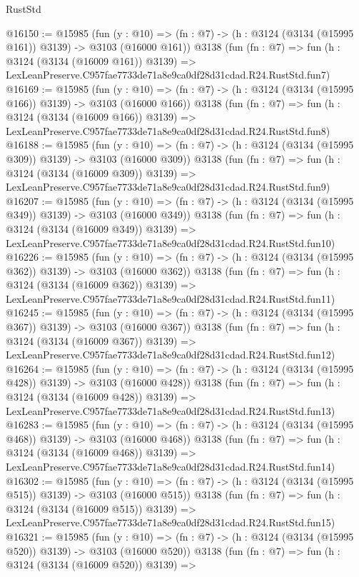\begin{lexlean}{RustStd}
\begin{coremodule}
@16150 := @15985
    (fun (y : @10) => (fn : @7) -> (h : @3124 (@3134 (@15995 @161)) @3139) -> @3103 (@16000 @161))
    @3138
    (fun (fn : @7) =>
    fun (h : @3124 (@3134 (@16009 @161)) @3139) =>
    LexLeanPreserve.C957fae7733de71a8e9ca0df28d31cdad.R24.RustStd.fun7)
@16169 := @15985
    (fun (y : @10) => (fn : @7) -> (h : @3124 (@3134 (@15995 @166)) @3139) -> @3103 (@16000 @166))
    @3138
    (fun (fn : @7) =>
    fun (h : @3124 (@3134 (@16009 @166)) @3139) =>
    LexLeanPreserve.C957fae7733de71a8e9ca0df28d31cdad.R24.RustStd.fun8)
@16188 := @15985
    (fun (y : @10) => (fn : @7) -> (h : @3124 (@3134 (@15995 @309)) @3139) -> @3103 (@16000 @309))
    @3138
    (fun (fn : @7) =>
    fun (h : @3124 (@3134 (@16009 @309)) @3139) =>
    LexLeanPreserve.C957fae7733de71a8e9ca0df28d31cdad.R24.RustStd.fun9)
@16207 := @15985
    (fun (y : @10) => (fn : @7) -> (h : @3124 (@3134 (@15995 @349)) @3139) -> @3103 (@16000 @349))
    @3138
    (fun (fn : @7) =>
    fun (h : @3124 (@3134 (@16009 @349)) @3139) =>
    LexLeanPreserve.C957fae7733de71a8e9ca0df28d31cdad.R24.RustStd.fun10)
@16226 := @15985
    (fun (y : @10) => (fn : @7) -> (h : @3124 (@3134 (@15995 @362)) @3139) -> @3103 (@16000 @362))
    @3138
    (fun (fn : @7) =>
    fun (h : @3124 (@3134 (@16009 @362)) @3139) =>
    LexLeanPreserve.C957fae7733de71a8e9ca0df28d31cdad.R24.RustStd.fun11)
@16245 := @15985
    (fun (y : @10) => (fn : @7) -> (h : @3124 (@3134 (@15995 @367)) @3139) -> @3103 (@16000 @367))
    @3138
    (fun (fn : @7) =>
    fun (h : @3124 (@3134 (@16009 @367)) @3139) =>
    LexLeanPreserve.C957fae7733de71a8e9ca0df28d31cdad.R24.RustStd.fun12)
@16264 := @15985
    (fun (y : @10) => (fn : @7) -> (h : @3124 (@3134 (@15995 @428)) @3139) -> @3103 (@16000 @428))
    @3138
    (fun (fn : @7) =>
    fun (h : @3124 (@3134 (@16009 @428)) @3139) =>
    LexLeanPreserve.C957fae7733de71a8e9ca0df28d31cdad.R24.RustStd.fun13)
@16283 := @15985
    (fun (y : @10) => (fn : @7) -> (h : @3124 (@3134 (@15995 @468)) @3139) -> @3103 (@16000 @468))
    @3138
    (fun (fn : @7) =>
    fun (h : @3124 (@3134 (@16009 @468)) @3139) =>
    LexLeanPreserve.C957fae7733de71a8e9ca0df28d31cdad.R24.RustStd.fun14)
@16302 := @15985
    (fun (y : @10) => (fn : @7) -> (h : @3124 (@3134 (@15995 @515)) @3139) -> @3103 (@16000 @515))
    @3138
    (fun (fn : @7) =>
    fun (h : @3124 (@3134 (@16009 @515)) @3139) =>
    LexLeanPreserve.C957fae7733de71a8e9ca0df28d31cdad.R24.RustStd.fun15)
@16321 := @15985
    (fun (y : @10) => (fn : @7) -> (h : @3124 (@3134 (@15995 @520)) @3139) -> @3103 (@16000 @520))
    @3138
    (fun (fn : @7) =>
    fun (h : @3124 (@3134 (@16009 @520)) @3139) =>

\end{coremodule}
\end{lexlean}
